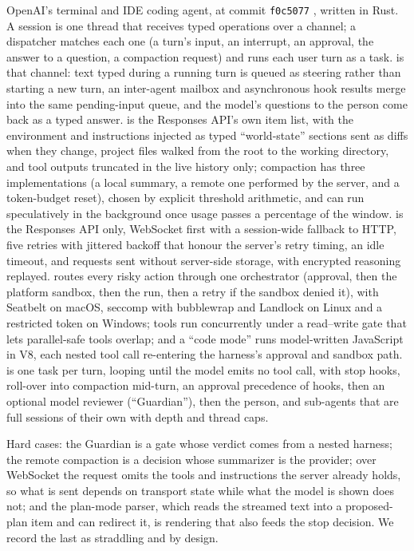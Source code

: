 OpenAI's terminal and IDE coding agent, at commit \texttt{f0c5077} \citep{codexcli}, written in Rust. A session is one thread that receives typed operations over a channel; a dispatcher matches each one (a turn's input, an interrupt, an approval, the answer to a question, a compaction request) and runs each user turn as a task.  is that channel: text typed during a running turn is queued as steering rather than starting a new turn, an inter-agent mailbox and asynchronous hook results merge into the same pending-input queue, and the model's questions to the person come back as a typed answer.  is the Responses API's own item list, with the environment and instructions injected as typed ``world-state'' sections sent as diffs when they change, project files walked from the root to the working directory, and tool outputs truncated in the live history only; compaction has three implementations (a local summary, a remote one performed by the server, and a token-budget reset), chosen by explicit threshold arithmetic, and can run speculatively in the background once usage passes a percentage of the window.  is the Responses API only, WebSocket first with a session-wide fallback to HTTP, five retries with jittered backoff that honour the server's retry timing, an idle timeout, and requests sent without server-side storage, with encrypted reasoning replayed.  routes every risky action through one orchestrator (approval, then the platform sandbox, then the run, then a retry if the sandbox denied it), with Seatbelt on macOS, seccomp with bubblewrap and Landlock on Linux and a restricted token on Windows; tools run concurrently under a read--write gate that lets parallel-safe tools overlap; and a ``code mode'' runs model-written JavaScript in V8, each nested tool call re-entering the harness's approval and sandbox path.  is one task per turn, looping until the model emits no tool call, with stop hooks, roll-over into compaction mid-turn, an approval precedence of hooks, then an optional model reviewer (``Guardian''), then the person, and sub-agents that are full sessions of their own with depth and thread caps.

Hard cases: the Guardian is a  gate whose verdict comes from a nested harness; the remote compaction is a  decision whose summarizer is the provider; over WebSocket the request omits the tools and instructions the server already holds, so what is sent depends on transport state while what the model is shown does not; and the plan-mode parser, which reads the streamed text into a proposed-plan item and can redirect it, is  rendering that also feeds the stop decision. We record the last as straddling  and  by design.
